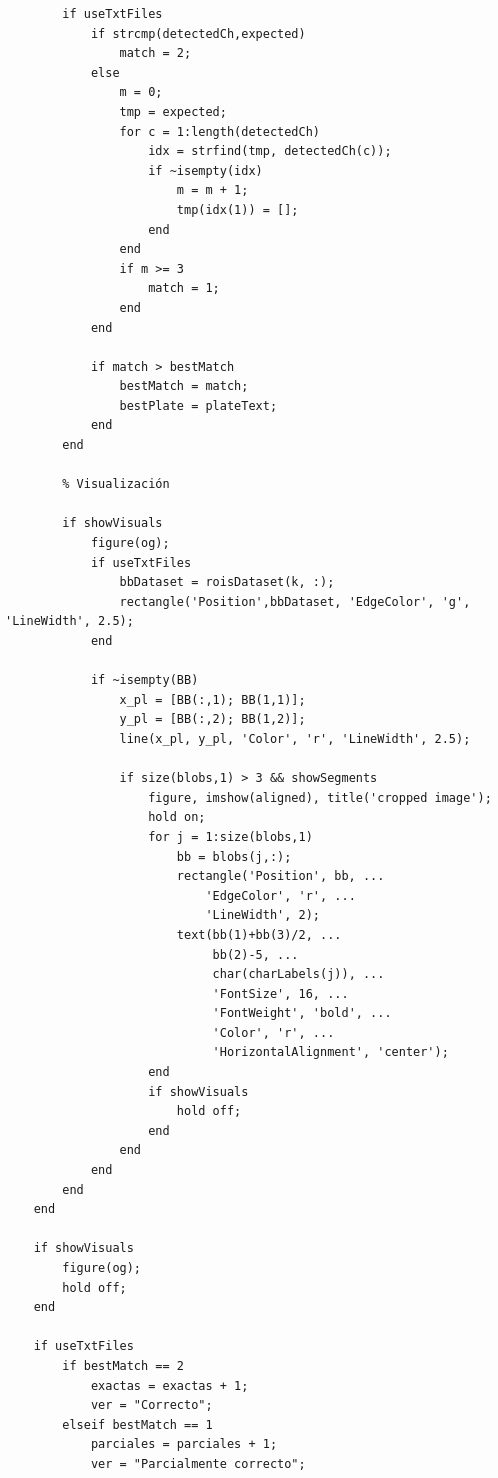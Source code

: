 \begin{verbatim}
        if useTxtFiles
            if strcmp(detectedCh,expected)
                match = 2;
            else
                m = 0;
                tmp = expected;
                for c = 1:length(detectedCh)
                    idx = strfind(tmp, detectedCh(c));
                    if ~isempty(idx)
                        m = m + 1;
                        tmp(idx(1)) = [];
                    end
                end
                if m >= 3
                    match = 1;
                end
            end
    
            if match > bestMatch
                bestMatch = match;
                bestPlate = plateText;
            end
        end
    
        % Visualización

        if showVisuals
            figure(og);
            if useTxtFiles
                bbDataset = roisDataset(k, :);
                rectangle('Position',bbDataset, 'EdgeColor', 'g', 'LineWidth', 2.5);
            end

            if ~isempty(BB)
                x_pl = [BB(:,1); BB(1,1)];
                y_pl = [BB(:,2); BB(1,2)];
                line(x_pl, y_pl, 'Color', 'r', 'LineWidth', 2.5);
        
                if size(blobs,1) > 3 && showSegments
                    figure, imshow(aligned), title('cropped image');
                    hold on;
                    for j = 1:size(blobs,1)
                        bb = blobs(j,:);
                        rectangle('Position', bb, ...
                            'EdgeColor', 'r', ...
                            'LineWidth', 2);
                        text(bb(1)+bb(3)/2, ...
                             bb(2)-5, ...
                             char(charLabels(j)), ...
                             'FontSize', 16, ...
                             'FontWeight', 'bold', ...
                             'Color', 'r', ...
                             'HorizontalAlignment', 'center');
                    end
                    if showVisuals
                        hold off;
                    end
                end
            end
        end
    end

    if showVisuals
        figure(og);
        hold off;
    end

    if useTxtFiles
        if bestMatch == 2
            exactas = exactas + 1;
            ver = "Correcto";
        elseif bestMatch == 1
            parciales = parciales + 1;
            ver = "Parcialmente correcto";


\end{verbatim}

